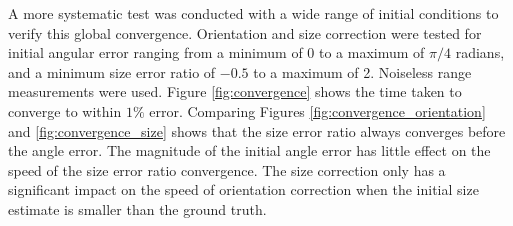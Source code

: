 A more systematic test was conducted with a wide range of initial conditions to verify this global convergence. Orientation and size correction were tested for initial angular error ranging from a minimum of 0 to a maximum of $\pi/4$ radians, and a minimum size error ratio of $-0.5$ to a maximum of 2. Noiseless range measurements were used.
Figure \ref{fig:convergence} shows the time taken to converge to within $1\%$ error. Comparing Figures \ref{fig:convergence_orientation} and \ref{fig:convergence_size} shows that the size error ratio always converges before the angle error. The magnitude of the initial angle error has little effect on the speed of the size error ratio convergence. The size correction only has a significant impact on the speed of orientation correction when the initial size estimate is smaller than the ground truth.
\begin{figure}
\centering
\end{figure}
